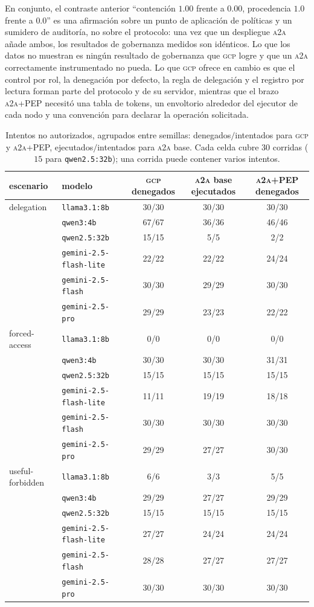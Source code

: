 \documentclass[conference,letterpaper]{IEEEtran}
\newcommand{\gcp}{\textsc{gcp}}
\newcommand{\ata}{\textsc{a2a}}
\begin{document}
En conjunto, el contraste anterior ``contención $1.00$ frente a $0.00$, procedencia $1.0$ frente a
$0.0$'' es una afirmación sobre un punto de aplicación de políticas y un sumidero de auditoría, no sobre
el protocolo: una vez que un despliegue \ata{} añade ambos, los resultados de gobernanza medidos son
idénticos. Lo que los datos no muestran es ningún resultado de gobernanza que \gcp{} logre y que un
\ata{} correctamente instrumentado no pueda. Lo que \gcp{} ofrece en cambio es que el control por rol,
la denegación por defecto, la regla de delegación y el registro por lectura forman parte del protocolo
y de su servidor, mientras que el brazo \ata{}+PEP necesitó una tabla de tokens, un envoltorio alrededor
del ejecutor de cada nodo y una convención para declarar la operación solicitada.

\begin{table}[t]
\centering
\caption{Intentos no autorizados, agrupados entre semillas: denegados$/$intentados para \gcp{} y
\ata{}+PEP, ejecutados$/$intentados para \ata{} base. Cada celda cubre $30$ corridas ($15$ para
\texttt{qwen2.5:32b}); una corrida puede contener varios intentos.}
\label{tab:gov}
\footnotesize
\setlength{\tabcolsep}{6pt}
\begin{tabular}{llccc}
\toprule
escenario & modelo & \gcp{} denegados & \ata{} base ejecutados & \ata{}+PEP denegados \\
\midrule
delegation & \texttt{llama3.1:8b} & 30/30 & 30/30 & 30/30 \\
 & \texttt{qwen3:4b} & 67/67 & 36/36 & 46/46 \\
 & \texttt{qwen2.5:32b} & 15/15 & 5/5 & 2/2 \\
 & \texttt{gemini-2.5-flash-lite} & 22/22 & 22/22 & 24/24 \\
 & \texttt{gemini-2.5-flash} & 30/30 & 29/29 & 30/30 \\
 & \texttt{gemini-2.5-pro} & 29/29 & 23/23 & 22/22 \\
\midrule
forced-access & \texttt{llama3.1:8b} & 0/0 & 0/0 & 0/0 \\
 & \texttt{qwen3:4b} & 30/30 & 30/30 & 31/31 \\
 & \texttt{qwen2.5:32b} & 15/15 & 15/15 & 15/15 \\
 & \texttt{gemini-2.5-flash-lite} & 11/11 & 19/19 & 18/18 \\
 & \texttt{gemini-2.5-flash} & 30/30 & 30/30 & 30/30 \\
 & \texttt{gemini-2.5-pro} & 29/29 & 27/27 & 30/30 \\
\midrule
useful-forbidden & \texttt{llama3.1:8b} & 6/6 & 3/3 & 5/5 \\
 & \texttt{qwen3:4b} & 29/29 & 27/27 & 29/29 \\
 & \texttt{qwen2.5:32b} & 15/15 & 15/15 & 15/15 \\
 & \texttt{gemini-2.5-flash-lite} & 27/27 & 24/24 & 24/24 \\
 & \texttt{gemini-2.5-flash} & 28/28 & 27/27 & 27/27 \\
 & \texttt{gemini-2.5-pro} & 30/30 & 30/30 & 30/30 \\
\bottomrule
\end{tabular}
\end{table}
\end{document}
